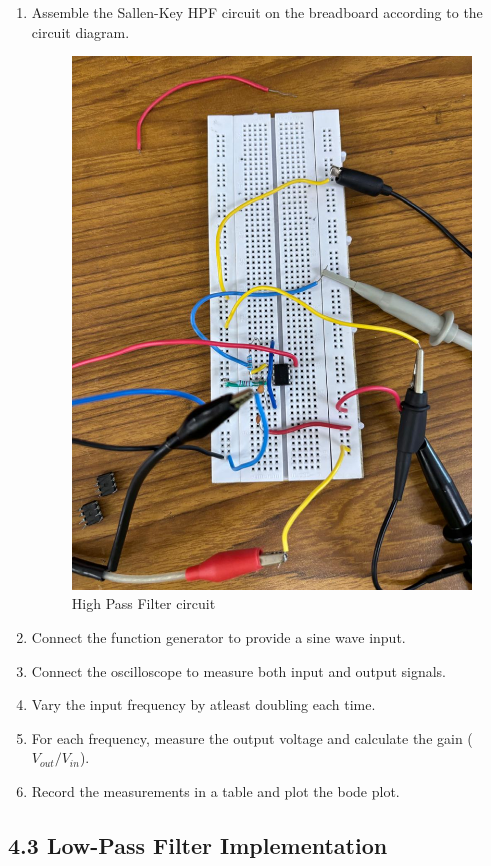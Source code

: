 \documentclass{article}
\begin{document}
\begin{enumerate}
\item Assemble the Sallen-Key HPF circuit on the breadboard according to the circuit diagram.
\begin{figure}[h!]
    \centering
    \includegraphics[width=0.5\linewidth]{figs/highpass_ciruit.jpeg}
    \caption{High Pass Filter circuit}
    \label{fig:enter-label}
\end{figure}
\item Connect the function generator to provide a sine wave input.
\item Connect the oscilloscope to measure both input and output signals.
\item Vary the input frequency by atleast doubling each time.
\item For each frequency, measure the output voltage and calculate the gain ($V_{out}/V_{in}$).
\item Record the measurements in a table and plot the bode plot.
\end{enumerate}

\subsection*{4.3 Low-Pass Filter Implementation}
\end{document}
